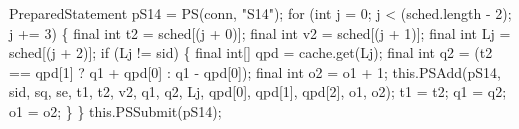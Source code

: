 \documentclass{article}
\def\nwendcode{\endtrivlist \endgroup}      %
\let\nwdocspar=\par
\theoremstyle{definition}                   %
\begin{document}
PreparedStatement pS14 = PS(conn, "S14");
for (int j = 0; j < (sched.length - 2); j += 3) \{
  final int t2 = sched[(j + 0)];
  final int v2 = sched[(j + 1)];
  final int Lj = sched[(j + 2)];
  if (Lj != sid) \{
    final int[] qpd = cache.get(Lj);
    final int q2 = (t2 == qpd[1] ? q1 + qpd[0] : q1 - qpd[0]);
    final int o2 = o1 + 1;
    this.PSAdd(pS14, sid, sq, se, t1, t2, v2, q1, q2, Lj,
          qpd[0], qpd[1], qpd[2], o1, o2);
    t1 = t2;
    q1 = q2;
    o1 = o2;
  \}
\}
this.PSSubmit(pS14);
\nwendcode{}\nwdocspar
\end{document}
